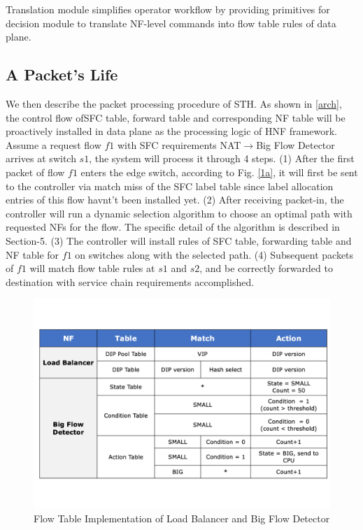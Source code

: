 \documentclass[10pt, conference, letterpaper]{IEEEtran}
\begin{document}

Translation module simplifies operator workflow by providing primitives for decision module to translate NF-level commands into flow table rules of data plane.

\subsection{A Packet's Life}
We then describe the packet processing procedure of STH.
As shown in \ref{arch}, the control flow ofSFC table, forward table and corresponding NF table will be proactively installed in data plane as the processing logic of HNF framework.
Assume a request flow $f1$ with SFC requirements NAT$\rightarrow$Big Flow Detector arrives at switch $s1$, the system will process it through 4 steps.
(1) After the first packet of flow $f1$ enters the edge switch, according to Fig. \ref{1a}, it will first be sent to the controller via match miss of the SFC label table since label allocation entries of this flow havnt't been installed yet.
(2) After receiving packet-in, the controller will run a dynamic selection algorithm to choose an optimal path with requested NFs for the flow. The specific detail of the algorithm is described in Section-5. 
(3) The controller will install rules of SFC table, forwarding table and NF table for $f1$ on switches along with the selected path.
(4) Subsequent packets of $f1$ will match flow table rules at $s1$ and $s2$, and be correctly forwarded to destination  with service chain requirements accomplished.


\begin{figure}[t]
\centerline{\includegraphics[scale=0.3]{src/flow.pdf}}
\caption{Flow Table Implementation of Load Balancer and Big Flow Detector}
\label{flow}
\end{figure}
\end{document}
